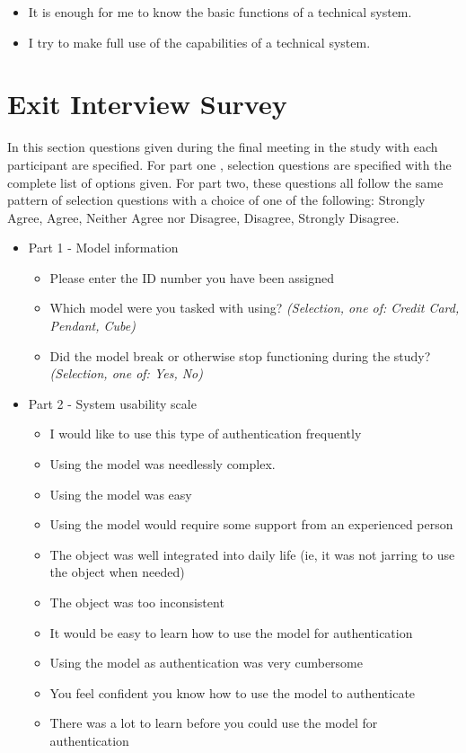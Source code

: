 \documentclass{l4proj}
\begin{document}
\begin{appendices}
\begin{itemize}
\begin{itemize}
        \item It is enough for me to know the basic functions of a technical system.
        
        \item I try to make full use of the capabilities of a technical system.
    \end{itemize}
\end{itemize}

\chapter{Exit Interview Survey}

In this section questions given during the final meeting in the study with each participant are specified. For part one , selection questions are specified with the complete list of options given. For part two, these questions all follow the same pattern of selection questions with a choice of one of the following: Strongly Agree, Agree, Neither Agree nor Disagree, Disagree, Strongly Disagree.
\begin{itemize}
    \item Part 1 - Model information
    \begin{itemize}
        \item Please enter the ID number you have been assigned
        \item Which model were you tasked with using? \textit{(Selection, one of: Credit Card, Pendant, Cube)}
        \item Did the model break or otherwise stop functioning during the study? \textit{(Selection, one of: Yes, No)}
    \end{itemize}
    \item Part 2 - System usability scale
    \begin{itemize}
        \item I would like to use this type of authentication frequently
        \item Using the model was needlessly complex.
        \item Using the model was easy
        \item Using the model would require some support from an experienced person
        \item The object was well integrated into daily life (ie, it was not jarring to use the object when needed)
        \item The object was too inconsistent
        \item It would be easy to learn how to use the model for authentication
        \item Using the model as authentication was very cumbersome
        \item You feel confident you know how to use the model to authenticate
        \item There was a lot to learn before you could use the model for authentication
    \end{itemize}
\end{itemize}


\end{appendices}
\end{document}
